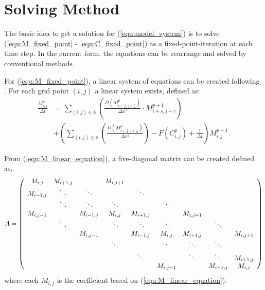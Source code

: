 \section{Solving Method}

The basic idea to get a solution for (\ref{equ:model_system}) is to solve (\ref{equ:M_fixed_point} - \ref{equ:C_fixed_point}) as a fixed-point-iteration at each time step.
In the current form, the equations can be rearrange and solved by conventional methods.

For (\ref{equ:M_fixed_point}), a linear system of equations can be created following \cite{saad2003iterativeMethod}.
For each grid point $(i,j)$ a linear system exists, defined as:
\begin{equation} \label{equ:M_linear_equation}
\begin{aligned}
  \frac{M^{k}_{i,j}}{\Delta t} &= 
    \sum_{(i,j) \in \mathbb{A}} \left( \frac{D( M^{p}_{i+\frac{s}{2}, j+\frac{r}{2}} )}{\Delta x^2} \cdot M^{p+1}_{i+s, j+r} \right) \\
  & +\left( \sum_{(i,j) \in \mathbb{A}} \left( \frac{D( M^{p}_{i+\frac{s}{2}, j+\frac{r}{2}} )}{\Delta x^2} \right) 
    - F(C^{p}_{i,j}) + \frac{1}{\Delta t} \right) M^{p+1}_{i,j}.
\end{aligned}
\end{equation} 

From (\ref{equ:M_linear_equation}), a five-diagonal matrix can be created defined as,
\begin{equation} \label{equ:M_matrix_form}
  A = 
    \left( 
      \begin{array}{c c c c c c c c c c}
        M_{i,j} & M_{i+1,j} &  & M_{i,j+1} &   \\
        M_{i-1,j} & \ddots & \ddots &   &  \ddots &   \\
        & \ddots & \ddots & \ddots & & \ddots & \\
        M_{i,j-1} &  & M_{i-1,j} & M_{i,j} & M_{i+1,j} &   &  M_{i,j+1} &   \\
        & \ddots & & \ddots & \ddots & \ddots & & \ddots\\
        & & M_{i,j-1} &  & M_{i-1,j} & M_{i,j} & M_{i+1,j} &  & M_{i,j+1} \\
        & & & \ddots & & \ddots & \ddots & \ddots & \\
        & & & & \ddots & & \ddots & \ddots & M_{i+1,j} \\
        & & & & & M_{i,j-1} & & M_{i-1,j} & M_{i,j}
      \end{array}
    \right)
\end{equation}
where each $M_{i,j}$ is the coefficient based on (\ref{equ:M_linear_equation}). 

